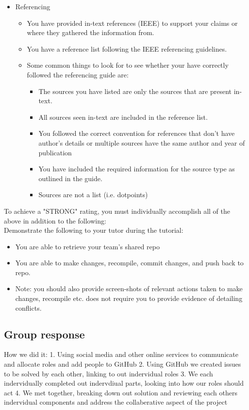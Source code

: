 \documentclass[a4paper, 11pt]{report}
\begin{document}
\begin{itemize}
\begin{itemize}
	\end{itemize}
\item Referencing
	\begin{itemize}
	\item You have provided in-text references (IEEE) to support your claims or where they gathered the information from.
	\item You have a reference list following the IEEE referencing guidelines.
	\item Some common things to look for to see whether your have correctly followed the referencing guide are:
		\begin{itemize}
		\item The sources you have listed are only the sources that are present in-text.
		\item All sources seen in-text are included in the reference list.
		\item You followed the correct convention for references that don’t have author’s details or multiple sources have the same author and year of publication
		\item You have included the required information for the source type as outlined in the guide.
		\item Sources are not a list (i.e. dotpoints)
		\end{itemize}
	\end{itemize}
\end{itemize}

To achieve a "STRONG" rating, you must individually accomplish all of the above in addition to the following:\\
Demonstrate the following to your tutor during the tutorial:
\begin{itemize}
\item You are able to retrieve your team’s shared repo
\item You are able to make changes, recompile, commit changes, and push back to repo.
\item Note: you should also provide screen-shots of relevant actions taken to make changes, recompile etc. does not require you to provide evidence of detailing conflicts.
\end{itemize}


\subsection{Group response}


How we did it:
1. Using social media and other online services to communicate and allocate roles and add people to GitHub 
2. Using GitHub we created issues to be solved by each other, linking to out indervidual roles 
3. We each indervidually completed out indervdiual parts, looking into how our roles should act 
4. We met together, breaking down out solution and reviewing each others indervidual components and address the collaberative aspect of the project
\end{document}
